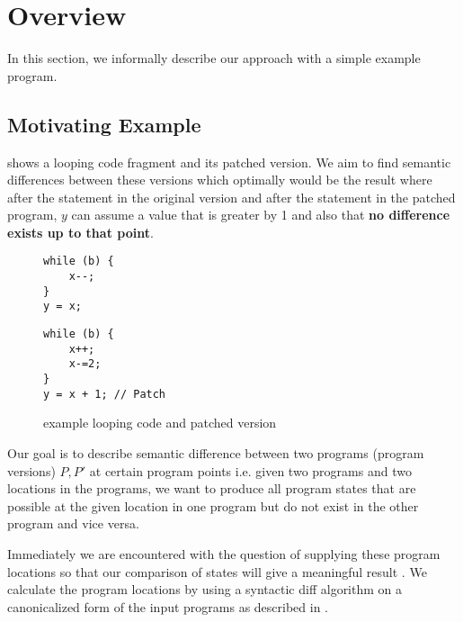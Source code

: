 \section{Overview} 

In this section, we informally describe our approach with a simple example program.

\subsection{Motivating Example}

 shows a looping code fragment and its patched version. We aim to find semantic differences between these versions which optimally would be the result where after the  statement in the original version and after the  statement in the patched program, $y$ can assume a value that is greater by 1 and also that \textbf{no difference exists up to that point}.

\begin{figure}[ht]
\begin{minipage}[b]{0.5\linewidth}
\centering
\begin{lstlisting}
while (b) {
    x--;
}
y = x;
\end{lstlisting}
\end{minipage}
\hspace{0.5cm}
\begin{minipage}[b]{0.5\linewidth}
\centering
\begin{lstlisting}
while (b) {
    x++;
    x-=2;
}
y = x + 1; // Patch
\end{lstlisting}
\end{minipage}
\caption{example looping code and patched version}
\end{figure}

Our goal is to describe semantic difference between two programs (program versions) $P,P'$ at certain program points i.e. given two programs and two locations in the programs, we want to produce all program states that are possible at the given location in one program but do not exist in the other program and vice versa.

Immediately we are encountered with the question of supplying these program locations so that our comparison of states will give a meaningful result . We calculate the program locations by using a syntactic diff algorithm on a canonicalized form of the input programs as described in .

